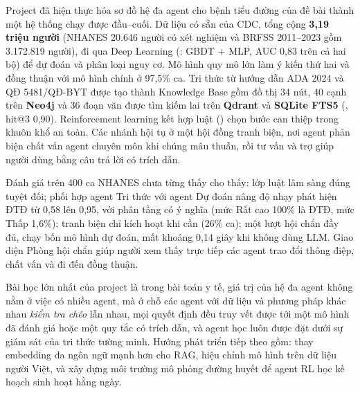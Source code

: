 
Project đã hiện thực hóa sơ đồ hệ đa agent cho bệnh tiểu đường của đề bài thành một hệ thống chạy được đầu–cuối. Dữ liệu có sẵn của CDC, tổng cộng \textbf{3,19 triệu người} (NHANES 20.646 người có xét nghiệm và BRFSS 2011–2023 gồm 3.172.819 người), đi qua Deep Learning (: GBDT + MLP, AUC 0,83 trên cả hai bộ) để dự đoán và phân loại nguy cơ. Mô hình quy mô lớn làm ý kiến thứ hai và đồng thuận với mô hình chính ở 97,5\% ca. Tri thức từ hướng dẫn ADA 2024 và QĐ 5481/QĐ-BYT được tạo thành Knowledge Base gồm đồ thị 34 nút, 40 cạnh trên \textbf{Neo4j} và 36 đoạn văn được tìm kiếm lai trên \textbf{Qdrant} và \textbf{SQLite FTS5} (, hit@3 0,90). Reinforcement learning kết hợp luật () chọn bước can thiệp trong khuôn khổ an toàn. Các nhánh hội tụ ở một hội đồng tranh biện, nơi agent phản biện chất vấn agent chuyên môn khi chúng mâu thuẫn, rồi tư vấn và trợ giúp người dùng bằng câu trả lời có trích dẫn.

Đánh giá trên 400 ca NHANES chưa từng thấy cho thấy: lớp luật lâm sàng đúng tuyệt đối; phối hợp agent Tri thức với agent Dự đoán nâng độ nhạy phát hiện ĐTĐ từ 0,58 lên 0,95, với phân tầng có ý nghĩa (mức Rất cao 100\% là ĐTĐ, mức Thấp 1,6\%); tranh biện chỉ kích hoạt khi cần (26\% ca); một lượt hội chẩn đầy đủ, chạy bốn mô hình dự đoán, mất khoảng 0,14 giây khi không dùng LLM. Giao diện Phòng hội chẩn giúp người xem thấy trực tiếp các agent trao đổi thông điệp, chất vấn và đi đến đồng thuận.

Bài học lớn nhất của project là trong bài toán y tế, giá trị của hệ đa agent không nằm ở việc có nhiều agent, mà ở chỗ các agent với dữ liệu và phương pháp khác nhau \emph{kiểm tra chéo} lẫn nhau, mọi quyết định đều truy vết được tới một mô hình đã đánh giá hoặc một quy tắc có trích dẫn, và agent học luôn được đặt dưới sự giám sát của tri thức tường minh. Hướng phát triển tiếp theo gồm: thay embedding đa ngôn ngữ mạnh hơn cho RAG, hiệu chỉnh mô hình trên dữ liệu người Việt, và xây dựng môi trường mô phỏng đường huyết để agent RL học kế hoạch sinh hoạt hằng ngày.
